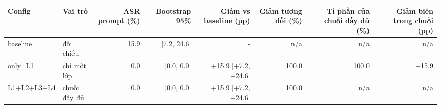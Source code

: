 \begin{tabular}{llrrrrrr}
\toprule
Config & Vai trò & ASR prompt (\%) & Bootstrap 95\% & Giảm vs baseline (pp) & Giảm tương đối (\%) & Tỉ phần của chuỗi đầy đủ (\%) & Giảm biên trong chuỗi (pp) \\
\midrule
baseline & đối chiếu & 15.9 & [7.2, 24.6] & - & n/a & n/a & n/a \\
only\_L1 & chỉ một lớp & 0.0 & [0.0, 0.0] & +15.9 [+7.2, +24.6] & 100.0 & 100.0 & +15.9 \\
L1+L2+L3+L4 & chuỗi đầy đủ & 0.0 & [0.0, 0.0] & +15.9 [+7.2, +24.6] & 100.0 & n/a & n/a \\
\bottomrule
\end{tabular}
